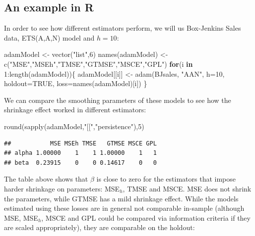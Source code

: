 \documentclass[
]{book}
\newenvironment{Shaded}{\begin{snugshade}}{\end{snugshade}}
\newcommand{\AttributeTok}[1]{\textcolor[rgb]{0.77,0.63,0.00}{#1}}
\newcommand{\ConstantTok}[1]{\textcolor[rgb]{0.00,0.00,0.00}{#1}}
\newcommand{\ControlFlowTok}[1]{\textcolor[rgb]{0.13,0.29,0.53}{\textbf{#1}}}
\newcommand{\DecValTok}[1]{\textcolor[rgb]{0.00,0.00,0.81}{#1}}
\newcommand{\FunctionTok}[1]{\textcolor[rgb]{0.00,0.00,0.00}{#1}}
\newcommand{\NormalTok}[1]{#1}
\newcommand{\OtherTok}[1]{\textcolor[rgb]{0.56,0.35,0.01}{#1}}
\newcommand{\SpecialCharTok}[1]{\textcolor[rgb]{0.00,0.00,0.00}{#1}}
\newcommand{\StringTok}[1]{\textcolor[rgb]{0.31,0.60,0.02}{#1}}
\theoremstyle{definition}
\theoremstyle{definition}
\theoremstyle{definition}
\theoremstyle{definition}
\theoremstyle{remark}
\begin{document}
\hypertarget{an-example-in-r-2}{%
\subsection{An example in R}\label{an-example-in-r-2}}

In order to see how different estimators perform, we will us Box-Jenkins Sales data, ETS(A,A,N) model and \(h=10\):

\begin{Shaded}
\begin{Highlighting}[]
\NormalTok{adamModel }\OtherTok{\textless{}{-}} \FunctionTok{vector}\NormalTok{(}\StringTok{"list"}\NormalTok{,}\DecValTok{6}\NormalTok{)}
\FunctionTok{names}\NormalTok{(adamModel) }\OtherTok{\textless{}{-}} \FunctionTok{c}\NormalTok{(}\StringTok{"MSE"}\NormalTok{,}\StringTok{"MSEh"}\NormalTok{,}\StringTok{"TMSE"}\NormalTok{,}\StringTok{"GTMSE"}\NormalTok{,}\StringTok{"MSCE"}\NormalTok{,}\StringTok{"GPL"}\NormalTok{)}
\ControlFlowTok{for}\NormalTok{(i }\ControlFlowTok{in} \DecValTok{1}\SpecialCharTok{:}\FunctionTok{length}\NormalTok{(adamModel))\{}
\NormalTok{  adamModel[[i]] }\OtherTok{\textless{}{-}} \FunctionTok{adam}\NormalTok{(BJsales, }\StringTok{"AAN"}\NormalTok{, }\AttributeTok{h=}\DecValTok{10}\NormalTok{, }\AttributeTok{holdout=}\ConstantTok{TRUE}\NormalTok{,}
                         \AttributeTok{loss=}\FunctionTok{names}\NormalTok{(adamModel)[i])}
\NormalTok{\}}
\end{Highlighting}
\end{Shaded}

We can compare the smoothing parameters of these models to see how the shrinkage effect worked in different estimators:

\begin{Shaded}
\begin{Highlighting}[]
\FunctionTok{round}\NormalTok{(}\FunctionTok{sapply}\NormalTok{(adamModel,}\StringTok{"[["}\NormalTok{,}\StringTok{"persistence"}\NormalTok{),}\DecValTok{5}\NormalTok{)}
\end{Highlighting}
\end{Shaded}

\begin{verbatim}
##           MSE MSEh TMSE   GTMSE MSCE GPL
## alpha 1.00000    1    1 1.00000    1   1
## beta  0.23915    0    0 0.14617    0   0
\end{verbatim}

The table above shows that \(\beta\) is close to zero for the estimators that impose harder shrinkage on parameters: MSE\(_h\), TMSE and MSCE. MSE does not shrink the parameters, while GTMSE has a mild shrinkage effect. While the models estimated using these losses are in general not comparable in-sample (although MSE, MSE\(_h\), MSCE and GPL could be compared via information criteria if they are scaled appropriately), they are comparable on the holdout:
\end{document}
